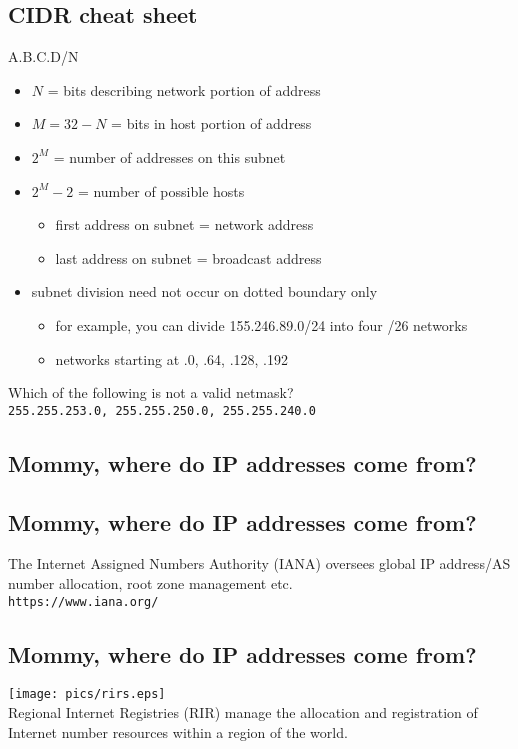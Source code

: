 \documentclass[xga]{xdvislides}
\begin{document}
\subsection{CIDR cheat sheet}
A.B.C.D/N
\begin{itemize}
	\item $N$ = bits describing network portion of address
	\item $M=32-N$ = bits in host portion of address
	\item $2^M$ = number of addresses on this subnet
	\item $2^M - 2$ = number of possible hosts
		\begin{itemize}
			\item first address on subnet = network address
			\item last address on subnet = broadcast address
		\end{itemize}
	\item subnet division need not occur on dotted boundary only
		\begin{itemize}
			\item for example, you can divide 155.246.89.0/24
				into four /26 networks
			\item networks starting at .0, .64, .128, .192
		\end{itemize}
\end{itemize}
\addvspace{.5in}
Which of the following is not a valid netmask? \\
\verb+255.255.253.0, 255.255.250.0, 255.255.240.0+

\subsection{Mommy, where do IP addresses come from?}

\subsection{Mommy, where do IP addresses come from?}
\Huge
\vfill
\begin{center}
The Internet Assigned Numbers Authority (IANA) oversees global IP
address/AS number allocation, root zone management etc.
\\
\vspace{.5in}
\verb+https://www.iana.org/+
\end{center}
\vfill
\Normalsize

\subsection{Mommy, where do IP addresses come from?}
\vspace*{\fill}
\begin{center}
	\texttt{[image: pics/rirs.eps]} \\
	\vspace{.5in}
	Regional Internet Registries (RIR) manage the allocation and
registration of Internet number resources within a region of the world.
\end{center}
\vspace*{\fill}
\end{document}

